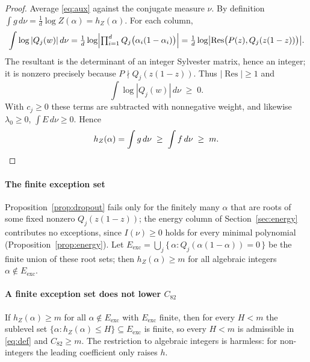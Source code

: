 \documentclass[11pt,reqno]{amsart}
\theoremstyle{plain}
\theoremstyle{definition}
\newcommand{\hZ}{h_Z}
\newcommand{\Cee}{C_{82}}
\newcommand{\Res}{\operatorname{Res}}
\newcommand{\dnu}{\,d\nu}
\begin{document}
\begin{proof}
Average \eqref{eq:aux} against the conjugate measure $\nu$. By definition
$\int g\dnu=\frac1d\log Z(\alpha)=\hZ(\alpha)$. For each column,
\[
  \int\log|Q_j(w)|\dnu
  =\tfrac1d\log\Bigl|\textstyle\prod_{i=1}^d Q_j\bigl(\alpha_i(1-\alpha_i)\bigr)\Bigr|
  =\tfrac1d\log\bigl|\Res\bigl(P(z),Q_j(z(1-z))\bigr)\bigr|.
\]
The resultant is the determinant of an integer Sylvester matrix, hence an integer;
it is nonzero precisely because $P\nmid Q_j(z(1-z))$. Thus $|\Res|\ge1$ and
\begin{equation}\label{eq:colpos}
  \int\log|Q_j(w)|\dnu\;\ge\;0 .
\end{equation}
With $c_j\ge0$ these terms are subtracted with nonnegative weight, and likewise
$\lambda_0\ge0$, $\int E\dnu\ge0$. Hence
\[
  \hZ(\alpha)=\int g\dnu\;\ge\;\int f\dnu\;\ge\;m. \qedhere
\]
\end{proof}

\paragraph{The finite exception set}
Proposition~\ref{prop:dropout} fails only for the finitely many $\alpha$ that are
roots of some fixed nonzero $Q_j(z(1-z))$; the energy column of
Section~\ref{sec:energy} contributes no exceptions, since
$I(\nu)\ge0$ holds for every minimal polynomial (Proposition~\ref{prop:energy}).
Let $E_{\mathrm{exc}}=\bigcup_j\{\,\alpha:Q_j(\alpha(1-\alpha))=0\,\}$ be the
finite union of these root sets; then $\hZ(\alpha)\ge m$ for all algebraic
integers $\alpha\notin E_{\mathrm{exc}}$.

\paragraph{A finite exception set does not lower \texorpdfstring{$\Cee$}{C82}}
If $\hZ(\alpha)\ge m$ for all $\alpha\notin E_{\mathrm{exc}}$ with
$E_{\mathrm{exc}}$ finite, then for every $H<m$ the sublevel set
$\{\alpha:\hZ(\alpha)\le H\}\subseteq E_{\mathrm{exc}}$ is finite, so every $H<m$
is admissible in \eqref{eq:def} and $\Cee\ge m$. The restriction to algebraic
integers is harmless: for non-integers the leading coefficient only raises $h$.
\end{document}
